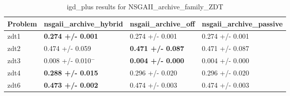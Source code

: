 \begin{table}
\caption{igd_plus results for NSGAII_archive_family_ZDT}
\label{NSGAII_archive_family_ZDT_igd_plus}
\begin{tabular}{llll}
\toprule
Problem & nsgaii_archive_hybrid & nsgaii_archive_off & nsgaii_archive_passive \\
\midrule
zdt1 & \textbf{0.274 +/- 0.001} & 0.274 +/- 0.001 & 0.274 +/- 0.001 \\
zdt2 & 0.474 +/- 0.059 & \textbf{0.471 +/- 0.087} & 0.471 +/- 0.087 \\
zdt3 & 0.008 +/- 0.010$^{-}$ & \textbf{0.004 +/- 0.000} & 0.004 +/- 0.000 \\
zdt4 & \textbf{0.288 +/- 0.015} & 0.296 +/- 0.020 & 0.296 +/- 0.020 \\
zdt6 & \textbf{0.473 +/- 0.002} & 0.474 +/- 0.003 & 0.474 +/- 0.003 \\
\bottomrule
\end{tabular}
\end{table}
